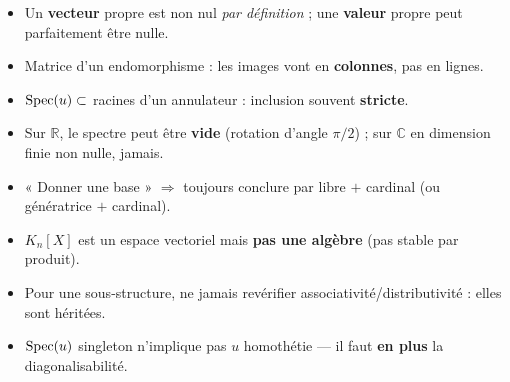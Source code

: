 \documentclass[10pt]{article}
\begin{document}
\begin{itemize}
\item Un \textbf{vecteur} propre est non nul \emph{par définition} ; une \textbf{valeur} propre peut
parfaitement être nulle.
\item Matrice d'un endomorphisme : les images vont en \textbf{colonnes}, pas en lignes.
\item $\operatorname{Spec}(u)\subset$ racines d'un annulateur : inclusion souvent \textbf{stricte}.
\item Sur $\mathbb{R}$, le spectre peut être \textbf{vide} (rotation d'angle $\pi/2$) ; sur $\mathbb{C}$
en dimension finie non nulle, jamais.
\item « Donner une base » $\Rightarrow$ toujours conclure par libre $+$ cardinal (ou génératrice $+$ cardinal).
\item $K_n[X]$ est un espace vectoriel mais \textbf{pas une algèbre} (pas stable par produit).
\item Pour une sous-structure, ne jamais revérifier associativité/distributivité : elles sont héritées.
\item $\operatorname{Spec}(u)$ singleton n'implique pas $u$ homothétie --- il faut \textbf{en plus} la diagonalisabilité.
\end{itemize}
\end{document}
